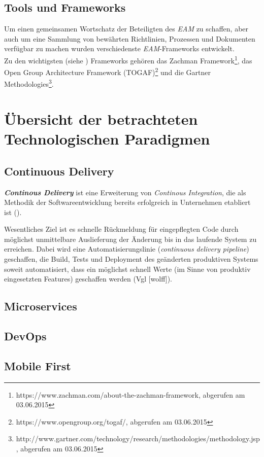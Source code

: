 \documentclass{llncs}
\begin{document}
\subsection{Tools und Frameworks}
Um einen gemeinsamen Wortschatz der Beteiligten des \textit{EAM} zu schaffen, aber auch um eine Sammlung von bewährten Richtlinien, Prozessen und Dokumenten verfügbar zu machen wurden verschiedenste \textit{EAM}-Frameworks entwickelt.\\

Zu den wichtigsten (siehe \cite{ben}) Frameworks gehören das Zachman Framework\footnote{https://www.zachman.com/about-the-zachman-framework, abgerufen am 03.06.2015}, das Open Group Architecture Framework (TOGAF)\footnote{https://www.opengroup.org/togaf/, abgerufen am 03.06.2015} und die Gartner Methodologies\footnote{http://www.gartner.com/technology/research/methodologies/methodology.jsp, abgerufen am 03.06.2015}.
%
\section{Übersicht der betrachteten Technologischen Paradigmen}
%
\subsection{Continuous Delivery}
\textbf{\textit{Continous Delivery}} ist eine Erweiterung von \textit{Continous Integration}, die als Methodik der Softwareentwicklung bereits erfolgreich in Unternehmen etabliert ist (\cite{fit:sto}).

Wesentliches Ziel ist es schnelle Rückmeldung für eingepflegten Code durch möglichst unmittelbare Auslieferung der Änderung bis in das laufende System zu erreichen. Dabei wird eine Automatisierungslinie (\textit{continuous delivery pipeline}) geschaffen, die Build, Tests und Deployment des geänderten produktiven Systems soweit automatisiert, dass ein möglichst schnell Werte (im Sinne von produktiv eingesetzten Features) geschaffen werden (Vgl [wolff]).
%
\subsection{Microservices}
\subsection{DevOps}
\subsection{Mobile First}
\end{document}
